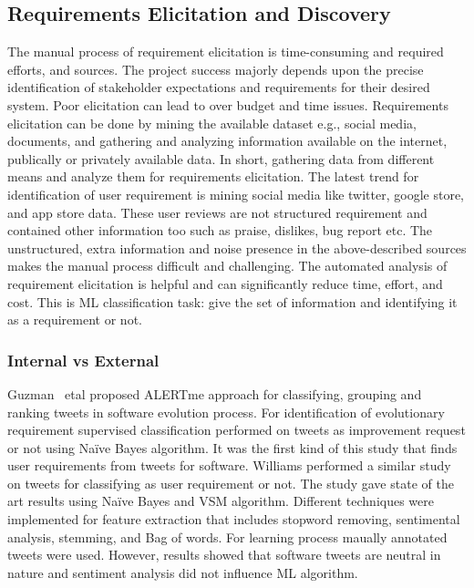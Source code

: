 
\subsection{Requirements Elicitation and Discovery} The manual process of requirement elicitation is time-consuming and required efforts, and sources. The project
success majorly depends upon the precise identification of stakeholder expectations and requirements for their desired system. Poor elicitation can lead to over budget and time issues. Requirements elicitation can be done by mining the available dataset e.g., social media, documents, and gathering and analyzing information available on the internet, publically or privately available data. In short, gathering data from different means and analyze them for requirements elicitation.  The latest trend for identification of user requirement is mining social media like twitter, google store, and app store data. These user reviews are not structured requirement and contained other information too such as praise, dislikes, bug report etc.  The unstructured, extra information and noise presence in the above-described sources makes the manual process difficult and challenging. The automated analysis of requirement elicitation is helpful and can significantly reduce time, effort, and cost. This is ML classification task: give the set of information and
identifying it as a requirement or not.
\\

\subsubsection{Internal vs External}
Guzman ~etal \cite{Guzman:2017} proposed ALERTme approach for classifying,
grouping and ranking tweets in software evolution process. For identification of
evolutionary requirement supervised classification performed on tweets as
improvement request or not using Naïve Bayes algorithm. It was the first kind of
this study that finds user requirements from tweets for software. Williams \etal
{} \cite{Williams:2017} performed a similar study on
tweets for classifying as user requirement or not. The study gave state of the art results using Naïve Bayes
and VSM algorithm. Different techniques were implemented for feature extraction
that includes stopword removing, sentimental analysis, stemming, and Bag of words. For learning process maually annotated tweets were used. However, results showed that
software tweets are neutral in nature and sentiment analysis did not influence ML algorithm.\\

